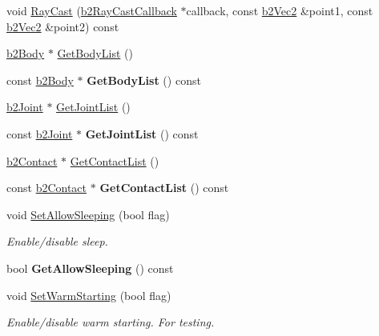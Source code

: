 \begin{DoxyCompactItemize}
\item 
void \hyperlink{classb2World_aa9955d94a254253997daaf16ce77bab6}{Ray\+Cast} (\hyperlink{classb2RayCastCallback}{b2\+Ray\+Cast\+Callback} $\ast$callback, const \hyperlink{structb2Vec2}{b2\+Vec2} \&point1, const \hyperlink{structb2Vec2}{b2\+Vec2} \&point2) const
\item 
\hyperlink{classb2Body}{b2\+Body} $\ast$ \hyperlink{classb2World_a0c7f4575a23e2ec044507fa248f431e0}{Get\+Body\+List} ()
\item 
\mbox{\label{classb2World_a8033d2e069bfe34ce1e385955e99a695}} 
const \hyperlink{classb2Body}{b2\+Body} $\ast$ {\bfseries Get\+Body\+List} () const
\item 
\hyperlink{classb2Joint}{b2\+Joint} $\ast$ \hyperlink{classb2World_a35adb43a8cfd186a176e086d49908bff}{Get\+Joint\+List} ()
\item 
\mbox{\label{classb2World_ab1ea85a2a61befbbb17fe762475cedf9}} 
const \hyperlink{classb2Joint}{b2\+Joint} $\ast$ {\bfseries Get\+Joint\+List} () const
\item 
\hyperlink{classb2Contact}{b2\+Contact} $\ast$ \hyperlink{classb2World_a92610ce7858e90d685de968584b6afcb}{Get\+Contact\+List} ()
\item 
\mbox{\label{classb2World_a06ab0b6ea2e1786954001639e7fda2bc}} 
const \hyperlink{classb2Contact}{b2\+Contact} $\ast$ {\bfseries Get\+Contact\+List} () const
\item 
\mbox{\label{classb2World_a6755872564fc3db70c69d2b9d349fa33}} 
void \hyperlink{classb2World_a6755872564fc3db70c69d2b9d349fa33}{Set\+Allow\+Sleeping} (bool flag)
\begin{DoxyCompactList}\small\item\em Enable/disable sleep. \end{DoxyCompactList}\item 
\mbox{\label{classb2World_a3d7ce9b87a54fb4f84433f6223d81175}} 
bool {\bfseries Get\+Allow\+Sleeping} () const
\item 
\mbox{\label{classb2World_a8e8c12142e8c4884a18787926a261359}} 
void \hyperlink{classb2World_a8e8c12142e8c4884a18787926a261359}{Set\+Warm\+Starting} (bool flag)
\begin{DoxyCompactList}\small\item\em Enable/disable warm starting. For testing. \end{DoxyCompactList}\item 

\end{DoxyCompactItemize}
